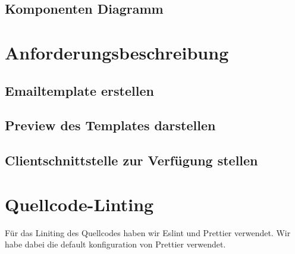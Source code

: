 \documentclass[a4paper, titlepage]{article}
\begin{document}
  \subsection{Komponenten Diagramm}
  \section{Anforderungsbeschreibung}
  \subsection{Emailtemplate erstellen}
  \subsection{Preview des Templates darstellen}
  \subsection{Clientschnittstelle zur Verfügung stellen}
  \subsection{}
  \section{Quellcode-Linting}
  Für das Liniting des Quellcodes haben wir Eslint und Prettier verwendet.
  Wir habe dabei die default konfiguration von Prettier verwendet.
\end{document}
